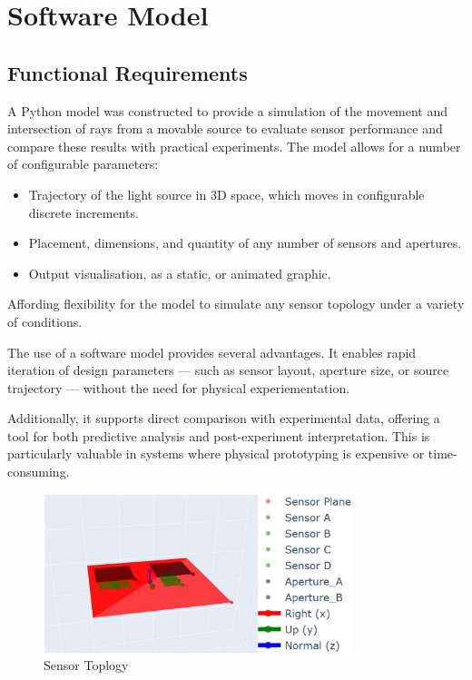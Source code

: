 \section{Software Model}
\label{sec:softwareModel}

\subsection{Functional Requirements}

A Python model was constructed to provide a simulation of the movement and intersection of rays from a movable source to evaluate sensor performance and compare these results with practical experiments.
The model allows for a number of configurable parameters:
\begin{itemize}
    \item Trajectory of the light source in 3D space, which moves in configurable discrete increments.
    \item Placement, dimensions, and quantity of any number of sensors and apertures.
    \item Output visualisation, as a static, or animated graphic.
\end{itemize}
Affording flexibility for the model to simulate any sensor topology under a variety of conditions.

The use of a software model provides several advantages. It enables rapid iteration of design parameters — such as sensor layout, aperture size, or source trajectory — without the need for physical experiementation. 
 
Additionally, it supports direct comparison with experimental data, offering a tool for both predictive analysis and post-experiment interpretation. 
This is particularly valuable in systems where physical prototyping is expensive or time-consuming.

\begin{figure}[htbp] %
    \centering
    \includegraphics[width=0.8\textwidth]{chapters/methodology/SoftwareModel/images/Sensor plane.png} %
    \caption{Sensor Toplogy}       %
    \label{fig:Sensor Topology}            %
\end{figure}                             %







